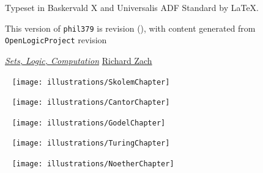 \noindent Typeset in Baskervald X and Universalis ADF Standard by
\LaTeX.

\vfill

\noindent This version of \texttt{phil379} is revision \gitAbbrevHash{}
(\gitAuthorDate), with content generated
from \texttt{OpenLogicProject} revision


\vfill


\renewcommand{\ollicensefont}{\fontsize{9pt}{12pt}\selectfont}

\noindent
\oluselicense
{\href{https://github.com/rzach/phil379}{\textit{Sets, Logic,
Computation}}}
{\href{http://richardzach.org/}{Richard Zach}}

\newpage
\pagestyle{leadbeater}
\tableofcontents*

\cleartoverso
\thispagestyle{empty}
\ \vfill
\noindent\hskip-1cm\texttt{[image: illustrations/SkolemChapter]}
\vfill



\cleartoverso 


\thispagestyle{empty}
\ \vfill
\noindent\hskip-1cm\texttt{[image: illustrations/CantorChapter]}
\vfill

\mainmatter

\pagestyle{leadbeater}


\cleartoverso
\ifodd\value{page}\fi
\thispagestyle{empty}
\ \vfill
\noindent\hskip-1cm\texttt{[image: illustrations/GodelChapter]}
\vfill


\cleartoverso
\ifodd\value{page}\fi
\thispagestyle{empty}
\ \vfill
\noindent\hskip-1cm\texttt{[image: illustrations/TuringChapter]}
\vfill



\cleartoverso
\ifodd\value{page}\fi
\thispagestyle{empty}
\ \vfill
\noindent\hskip-1cm\texttt{[image: illustrations/NoetherChapter]}
\vfill

